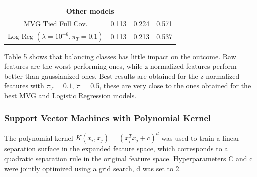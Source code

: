 \documentclass[12pt,a4paper]{article}
\begin{document}
\begin{center}
\begin{tabular}{@{}cccc@{}}
        \hline
        \multicolumn{4}{c}{Other models}                                                                                   \\
        \hline
        MVG Tied Full Cov.                           & 0.113                 & 0.224                & 0.571                \\
        Log Reg \((\lambda = 10^{-6}, \pi_T = 0.1)\) & 0.113                 & 0.213                & 0.537                \\
    \end{tabular}
\end{center}

Table 5 shows that balancing classes has little impact on the outcome.
Raw features are the worst-performing ones, while z-normalized features perform better than gaussianized ones.
Best results are obtained for the z-normalized features with $\pi_T = 0.1$, \(\tilde{\pi}\) = 0.5, these are very close to the ones obtained for the best MVG and Logistic Regression models.

\subsubsection{Support Vector Machines with Polynomial Kernel}

The polynomial kernel $K(x_i, x_j) = (x_i^Tx_j + c)^d$ was used to train a linear separation surface in the expanded feature space, which corresponds to a quadratic separation rule in the original feature space.
Hyperparameters C and c were jointly optimized using a grid search, d was set to 2.
\end{document}
